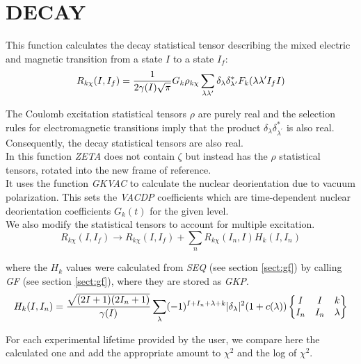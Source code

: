 \section{DECAY}
\label{sect:decay}

\noindent This function calculates the decay statistical tensor describing
the mixed electric and magnetic transition from a state $I$ to a state
$I_f$:\\

\begin{equation}
R_{k\chi}(I, I_f) = {1 \over 2 \gamma(I) \sqrt{\pi}}
G_k \rho_{k\chi}
\sum_{\lambda \lambda^\prime}
\delta_\lambda \delta_{\lambda^\prime}^* F_k(\lambda \lambda^\prime I_f I)
\end{equation}

\noindent The Coulomb excitation statistical tensors $\rho$ are purely real
and the selection rules for electromagnetic transitions imply that the
product $\delta_\lambda \delta_{\lambda^\prime}^*$ is also real.
Consequently, the decay statistical tensors are also real.\\

\noindent In this function {\em ZETA} does not contain $\zeta$ but instead
has the $\rho$ statistical tensors, rotated into the new frame of reference.\\

\noindent It uses the function {\em GKVAC} to calculate the nuclear
deorientation due to vacuum polarization. This sets the {\em VACDP}
coefficients which are time-dependent nuclear deorientation coefficients
$G_k(t)$ for the given level.\\

\noindent We also modify the statistical tensors to account for multiple
excitation.\\

\begin{equation}
R_{k\chi}(I, I_f) \rightarrow R_{k\chi}(I, I_f) +
\sum_n R_{k\chi}(I_n, I) H_k(I, I_n)
\end{equation}

\noindent where the $H_k$ values were calculated from {\em SEQ} (see section
\ref{sect:gf}) by calling {\em GF} (see section \ref{sect:gf}), where they
are stored as {\em GKP}.\\

\begin{equation}
H_k(I, I_n) =
{\sqrt{(2 I + 1) (2 I_n + 1)} \over \gamma(I)}
\sum_\lambda (-1)^{I + I_n + \lambda + k}
|\delta_\lambda|^2
(1 + c(\lambda))
\begin{Bmatrix}
I & I & k\\
I_n & I_n & \lambda
\end{Bmatrix}
\end{equation}

\noindent For each experimental lifetime provided by the user, we compare
here the calculated one and add the appropriate amount to $\chi^2$ and the
log of $\chi^2$.\\

